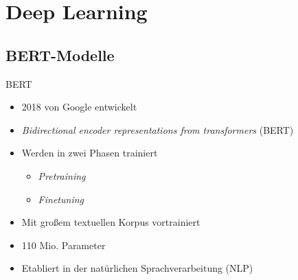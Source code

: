 \documentclass[aspectratio=169]{beamer} %
\begin{document}
\section{Deep Learning}


\subsection{BERT-Modelle}

\begin{frame}{BERT}
    \begin{itemize}
        \item 2018 von Google entwickelt
        \item \textit{Bidirectional encoder representations from transformers} (BERT)
        \item Werden in zwei Phasen trainiert
        \begin{itemize}
          \item \textit{Pretraining} 
          \item \textit{Finetuning}
        \end{itemize}
        \item Mit großem textuellen Korpus vortrainiert
        \item 110 Mio. Parameter
        \item Etabliert in der natürlichen Sprachverarbeitung (NLP)
    \end{itemize}
\end{frame}
\end{document}
